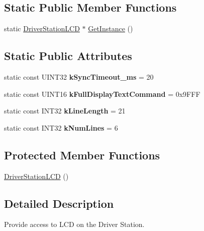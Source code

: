 \subsection*{\-Static \-Public \-Member \-Functions}
\begin{DoxyCompactItemize}
\item 
static \hyperlink{classDriverStationLCD}{\-Driver\-Station\-L\-C\-D} $\ast$ \hyperlink{classDriverStationLCD_a81d206a65012b4d84c3ce415ec13a5a3}{\-Get\-Instance} ()
\end{DoxyCompactItemize}
\subsection*{\-Static \-Public \-Attributes}
\begin{DoxyCompactItemize}
\item 
\hypertarget{classDriverStationLCD_a45038d2c69d132c5c79a1badcc5946fc}{static const \-U\-I\-N\-T32 {\bfseries k\-Sync\-Timeout\-\_\-ms} = 20}\label{classDriverStationLCD_a45038d2c69d132c5c79a1badcc5946fc}

\item 
\hypertarget{classDriverStationLCD_a26f33bcca9271380c8f2ce8f8c2b1347}{static const \-U\-I\-N\-T16 {\bfseries k\-Full\-Display\-Text\-Command} = 0x9\-F\-F\-F}\label{classDriverStationLCD_a26f33bcca9271380c8f2ce8f8c2b1347}

\item 
\hypertarget{classDriverStationLCD_a08e533705d5cea74ef59aa7f5bfddc69}{static const \-I\-N\-T32 {\bfseries k\-Line\-Length} = 21}\label{classDriverStationLCD_a08e533705d5cea74ef59aa7f5bfddc69}

\item 
\hypertarget{classDriverStationLCD_a13103ae669faff5bf9b44317727143b9}{static const \-I\-N\-T32 {\bfseries k\-Num\-Lines} = 6}\label{classDriverStationLCD_a13103ae669faff5bf9b44317727143b9}

\end{DoxyCompactItemize}
\subsection*{\-Protected \-Member \-Functions}
\begin{DoxyCompactItemize}
\item 
\hyperlink{classDriverStationLCD_ac94af42c92e3def74ed1005fdf0233d2}{\-Driver\-Station\-L\-C\-D} ()
\end{DoxyCompactItemize}


\subsection{\-Detailed \-Description}
\-Provide access to \-L\-C\-D on the \-Driver \-Station.

